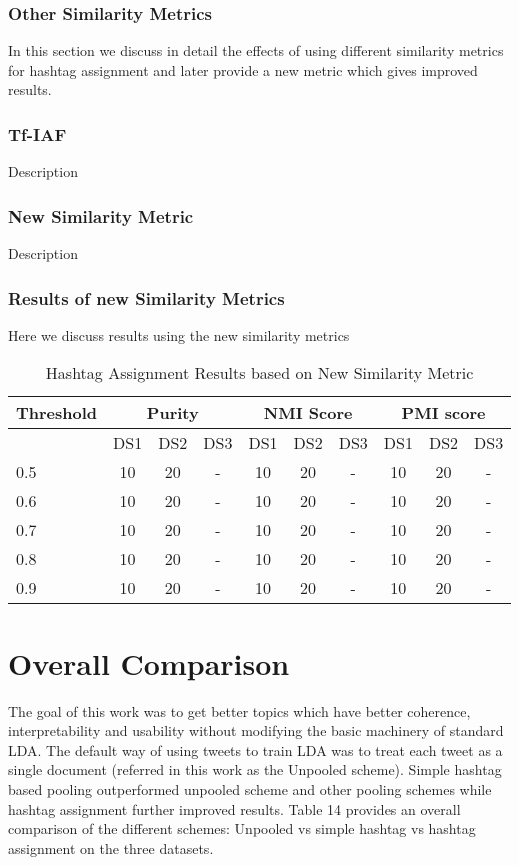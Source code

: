 \documentclass[10pt,a5paper,twoside]{article}
\begin{document}
\subsubsection{Other Similarity Metrics}
In this section we discuss in detail the effects of using different similarity metrics for hashtag assignment and later provide a new metric which gives improved results.

\subsubsection*{Tf-IAF}
Description\\
\subsubsection{New Similarity Metric}
Description\\

\subsubsection{Results of new Similarity Metrics}
Here we discuss results using the new similarity metrics\\
\begin{table}[!h]
\setcounter{table}{12}
\centering
	\begin{tabular}{|l|ccc|ccc|ccc|}
	\hline
	Threshold  & \multicolumn {3}{c}{Purity} & \multicolumn {3}{c}{NMI Score} & \multicolumn {3}{c}{PMI score}\\
	\hline
	 & DS1 & DS2 & DS3 &  DS1 & DS2 & DS3 &  DS1 & DS2 & DS3\\
	\hline
	0.5 & 10 & 20 & - & 10 & 20 & - & 10 & 20 & - \\
	\hline
	0.6 & 10 & 20 & - & 10 & 20 & - & 10 & 20 & - \\
	\hline
	0.7 & 10 & 20 & - & 10 & 20 & - & 10 & 20 & - \\
	\hline
	0.8 & 10 & 20 & - & 10 & 20 & - & 10 & 20 & - \\
	\hline
	0.9 & 10 & 20 & - & 10 & 20 & - & 10 & 20 & - \\
	\hline
	\end{tabular}
\caption{Hashtag Assignment Results based on New Similarity Metric}\label{Table}
\end{table}


\section{Overall Comparison}
The goal of this work was to get better topics which have better coherence, interpretability and usability without modifying the basic machinery of standard LDA. The default way of using tweets to train LDA was to treat each tweet as a single document (referred in this work as the Unpooled scheme). Simple hashtag based pooling outperformed unpooled scheme and other pooling schemes while hashtag assignment further improved results. Table 14 provides an overall comparison of the different schemes: Unpooled vs simple hashtag vs hashtag assignment on the three datasets.
\\
\end{document}
